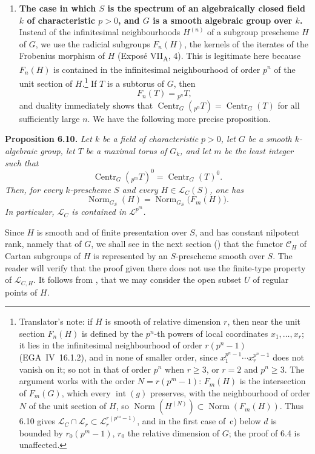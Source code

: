 \begin{enumerate}
\item \textbf{The case in which \(S\) is the spectrum of an algebraically
closed field \(k\) of characteristic \(p>0\), and \(G\) is a smooth
algebraic group over \(k\).}
Instead of the infinitesimal neighbourhoods \(H^{(n)}\) of a subgroup
prescheme \(H\) of \(G\), we use the radicial subgroups \(F_n(H)\), the
kernels of the iterates of the Frobenius morphism of \(H\)
(Exposé VII\textsubscript{A}, 4). This is legitimate here because \(F_n(H)\)
is contained in the infinitesimal neighbourhood of order \(p^n\) of the
unit section of \(H\).\footnote{Translator's note: if \(H\) is smooth of relative dimension \(r\), then near the unit section \(F_n(H)\) is defined by the \(p^n\)-th powers of local coordinates \(x_1,\ldots,x_r\); it lies in the infinitesimal neighbourhood of order \(r(p^n-1)\) (EGA~IV~16.1.2), and in none of smaller order, since \(x_1^{p^n-1}\cdots x_r^{p^n-1}\) does not vanish on it; so not in that of order \(p^n\) when \(r\geq3\), or \(r=2\) and \(p^n\geq3\). The argument works with the order \(N=r(p^m-1)\): \(F_m(H)\) is the intersection of \(F_m(G)\), which every \(\operatorname{int}(g)\) preserves, with the neighbourhood of order \(N\) of the unit section of \(H\), so \(\operatorname{Norm}(H^{(N)})\subset\operatorname{Norm}(F_m(H))\). Thus 6.10 gives \(\mathcal L_C\cap\mathcal L_r\subset\mathcal L_r^{r(p^m-1)}\), and in the first case of~c) below \(d\) is bounded by \(r_0(p^m-1)\), \(r_0\) the relative dimension of \(G\); the proof of 6.4 is unaffected.} If \(T\) is a subtorus of \(G\), then
\[
F_n(T)={}_{p^n}T,
\]
and duality immediately shows that
\(\operatorname{Centr}_G({}_{p^n}T)=\operatorname{Centr}_G(T)\) for all
sufficiently large \(n\). We have the following more precise proposition.
\end{enumerate}

\textbf{Proposition 6.10.} \emph{Let \(k\) be a field of characteristic
\(p>0\), let \(G\) be a smooth \(k\)-algebraic group, let \(T\) be a maximal
torus of \(G_k\), and let \(m\) be the least integer such that
\[
\operatorname{Centr}_G({}_{p^m}T)^0
 =\operatorname{Centr}_G(T)^0.
\]
Then, for every \(k\)-prescheme \(S\) and every
\(H\in\mathcal L_C(S)\), one has
\[
\operatorname{Norm}_{G_S}(H)
 =\operatorname{Norm}_{G_S}\bigl(F_m(H)\bigr).
\]
In particular, \(\mathcal L_C\) is contained in \(\mathcal L^{p^m}\).}

Since \(H\) is smooth and of finite presentation over \(S\), and has constant
nilpotent rank, namely that of \(G\), we shall see in the next section ()
that the functor \(\mathcal C_H\) of Cartan subgroups of \(H\) is represented
by an \(S\)-prescheme smooth over \(S\). The reader will verify that the proof
given there does not use the finite-type property of \(\mathcal L_{C,H}\).
It follows from , that we may consider the open subset \(U\)
of regular points of \(H\).

